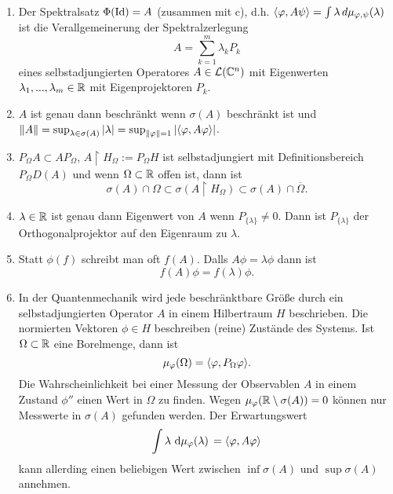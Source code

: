 \documentclass{mycourse}
\begin{document}
\begin{nt*}
\begin{enumerate}[1)]
\item Der Spektralsatz $\Phi(\Id)=A$ (zusammen mit c), d.h. $\< \phi, A\psi\> = \int \lambda \, d\mu_{\phi, \psi}(\lambda)$ ist die Verallgemeinerung der Spektralzerlegung
\[
	A= \sum_{k=1}^m \lambda_k P_k
\]
eines selbstadjungierten Operatores $A\in \mathcal L(\C^n)$ mit Eigenwerten $\lambda_1,...,\lambda_m \in \R$ mit Eigenprojektoren $P_k$.
\item $A$ ist genau dann beschränkt wenn $\sigma(A)$ beschränkt ist und $\| A \| = \sup_{\lambda \in \sigma(A)} | \lambda | = \sup_{\| \phi \| = 1} | \< \phi, A\phi\>|$.
\item $P_\Omega A\subset A P_\Omega$, $A\upharpoonright H_\Omega := P_\Omega H$ ist selbstadjungiert mit Definitionsbereich $P_\Omega D(A)$ und wenn $\Omega \subset \R$ offen ist, dann ist 
\[
	\sigma(A) \cap \Omega \subset \sigma(A \upharpoonright H_\Omega) \subset \sigma(A) \cap \overline{\Omega}.
\]
\item $\lambda \in \R$ ist genau dann Eigenwert von $A$ wenn $P_{\{\lambda\}} \neq 0$. Dann ist $P_{\{\lambda\}}$ der Orthogonalprojektor auf den Eigenraum zu $\lambda$.
\item Statt $\phi(f)$ schreibt man oft $f(A)$. Dalls $A\phi= \lambda \phi$ dann ist
\[
f(A) \phi = f(\lambda) \phi.
\]
\item In der Quantenmechanik wird jede beschränktbare Größe durch ein selbstadjungierten Operator $A$ in einem Hilbertraum $H$ beschrieben. Die normierten Vektoren $\phi \in H$ beschreiben (reine) Zustände des Systems. Ist $\Omega \subset \R$ eine Borelmenge, dann ist
\[
\mu_\phi(\Omega) = \< \phi, P_\Omega \phi \>.
\]
Die Wahrscheinlichkeit bei einer Messung der Observablen $A$ in einem Zustand $\phi''$ einen Wert in $\Omega$ zu finden. Wegen $\mu_\phi(\R\setminus \sigma(A))=0$ können nur Messwerte in $\sigma(A)$ gefunden werden. Der Erwartungswert
\[
\int \lambda \, \dx[\mu_\phi(\lambda)] = \< \phi, A\phi\>
\]
kann allerding einen beliebigen Wert zwischen $\inf\sigma(A)$ und $\sup \sigma(A)$ annehmen.
\end{enumerate}
\end{nt*}
\end{document}
